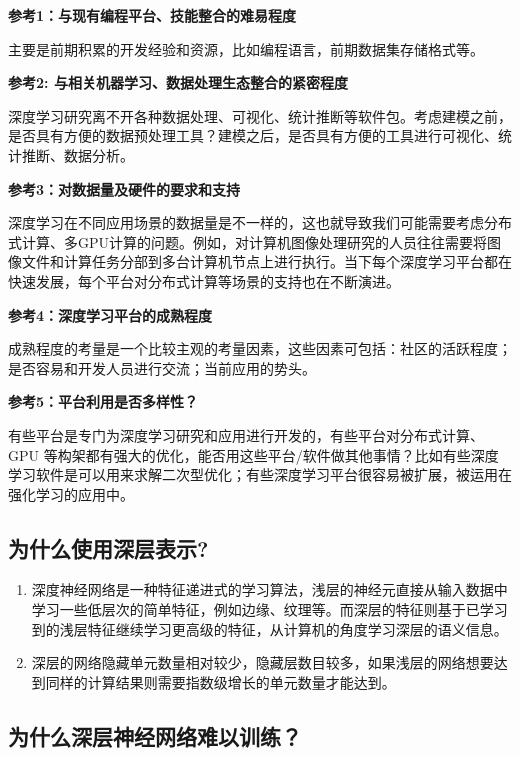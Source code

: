 \textbf{参考1：与现有编程平台、技能整合的难易程度}

​ 主要是前期积累的开发经验和资源，比如编程语言，前期数据集存储格式等。

\textbf{参考2: 与相关机器学习、数据处理生态整合的紧密程度}

​
深度学习研究离不开各种数据处理、可视化、统计推断等软件包。考虑建模之前，是否具有方便的数据预处理工具？建模之后，是否具有方便的工具进行可视化、统计推断、数据分析。

\textbf{参考3：对数据量及硬件的要求和支持}

​
深度学习在不同应用场景的数据量是不一样的，这也就导致我们可能需要考虑分布式计算、多GPU计算的问题。例如，对计算机图像处理研究的人员往往需要将图像文件和计算任务分部到多台计算机节点上进行执行。当下每个深度学习平台都在快速发展，每个平台对分布式计算等场景的支持也在不断演进。

\textbf{参考4：深度学习平台的成熟程度}

​
成熟程度的考量是一个比较主观的考量因素，这些因素可包括：社区的活跃程度；是否容易和开发人员进行交流；当前应用的势头。

\textbf{参考5：平台利用是否多样性？}

​
有些平台是专门为深度学习研究和应用进行开发的，有些平台对分布式计算、GPU
等构架都有强大的优化，能否用这些平台/软件做其他事情？比如有些深度学习软件是可以用来求解二次型优化；有些深度学习平台很容易被扩展，被运用在强化学习的应用中。

\subsection{为什么使用深层表示?}\label{ux4e3aux4ec0ux4e48ux4f7fux7528ux6df1ux5c42ux8868ux793a}

\begin{enumerate}
\def\labelenumi{\arabic{enumi}.}
 
\item
  深度神经网络是一种特征递进式的学习算法，浅层的神经元直接从输入数据中学习一些低层次的简单特征，例如边缘、纹理等。而深层的特征则基于已学习到的浅层特征继续学习更高级的特征，从计算机的角度学习深层的语义信息。
\item
  深层的网络隐藏单元数量相对较少，隐藏层数目较多，如果浅层的网络想要达到同样的计算结果则需要指数级增长的单元数量才能达到。
\end{enumerate}

\subsection{为什么深层神经网络难以训练？}\label{ux4e3aux4ec0ux4e48ux6df1ux5c42ux795eux7ecfux7f51ux7edcux96beux4ee5ux8badux7ec3}

